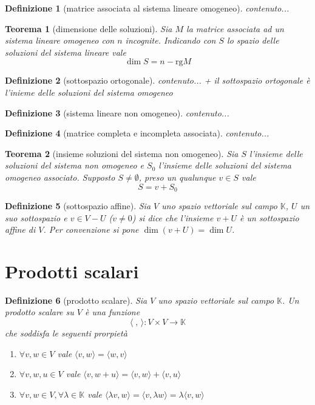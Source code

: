 \documentclass[9pt, a4paper]{article}
\newcommand{\K}{\mathbb{K}}
\newcommand{\letvs}{Sia $ V $ uno spazio vettoriale sul campo $ \K $}
\newcommand{\scprd}[2]{\langle #1, #2 \rangle}
\theoremstyle{mythm}
\newtheorem{definition}{Definizione}[section]
\newtheorem{thm}{Teorema}[section]
\begin{document}
\begin{definition}[matrice associata al sistema lineare omogeneo]
	contenuto...
\end{definition}

\begin{thm}[dimensione delle soluzioni]
	Sia $ M $ la matrice associata ad un sistema lineare omogeneo con $ n $ incognite. Indicando con $ S $ lo spazio delle soluzioni del sistema lineare vale \[\dim S = n - \mathrm{rg}M\]
\end{thm}

\begin{definition}[sottospazio ortogonale]
	contenuto... + \textsf{il sottospazio ortogonale è l'inieme delle soluzioni del sistema omogeneo}
\end{definition}

\begin{definition}[sistema lineare non omogeneo]
	contenuto...
\end{definition}

\begin{definition}[matrice completa e incompleta associata]
	contenuto...
\end{definition}

\begin{thm}[insieme soluzioni del sistema non omogeneo]
	Sia $ S $ l'insieme delle soluzioni del sistema non omogeneo e $ S_0 $ l'insieme delle soluzioni del sistema omogeneo associato. Supposto $ S \neq \emptyset $, preso un qualunque $ v \in S $ vale \[S = v + S_0\]
\end{thm}

\begin{definition}[sottospazio affine]
	\letvs, $ U $ un suo sottospazio e $ v \in V - U $ ($ v \neq 0 $) si dice che l'insieme $ v + U $ è un sottospazio affine di $ V $. Per convenzione si pone $ \dim (v + U) = \dim U $.
\end{definition}

\clearpage

\section{Prodotti scalari}

\begin{definition}[prodotto scalare]
	\letvs. Un prodotto scalare su $ V $ è una funzione \[\scprd{\;}{\,} \colon V \times V \to \K \] che soddisfa le seguenti prorpietà
	\begin{enumerate}[label=(\roman*)]
		\item $ \forall v,w \in V $ vale $ \scprd{v}{w} = \scprd{w}{v} $
		\item $ \forall v, w, u \in V $ vale $ \scprd{v}{w + u} = \scprd{v}{w} + \scprd{v}{u} $
		\item $ \forall v, w \in V, \forall \lambda \in \K $ vale $ \scprd{\lambda v}{w} = \scprd{v}{\lambda w} = \lambda \scprd{v}{w} $
	\end{enumerate}	
\end{definition}
\end{document}
